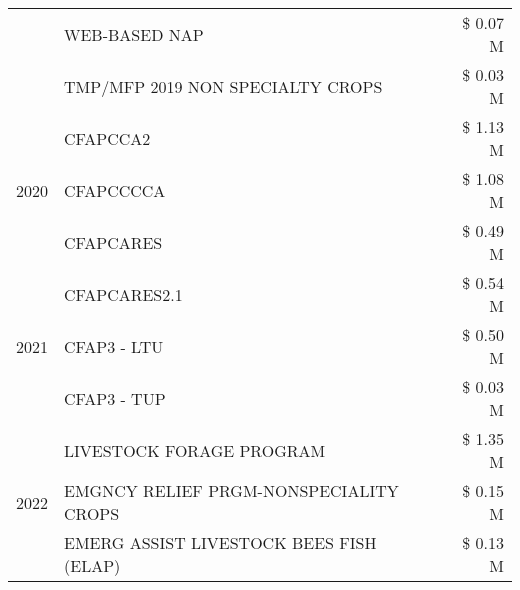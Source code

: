 \begin{tabular}{llr}
 & WEB-BASED NAP & \$ 0.07 M \\
 & TMP/MFP 2019 NON SPECIALTY CROPS & \$ 0.03 M \\
\cline{1-3}
\multirow[t]{3}{*}{2020} & CFAPCCA2 & \$ 1.13 M \\
 & CFAPCCCCA & \$ 1.08 M \\
 & CFAPCARES & \$ 0.49 M \\
\cline{1-3}
\multirow[t]{3}{*}{2021} & CFAPCARES2.1 & \$ 0.54 M \\
 & CFAP3 - LTU & \$ 0.50 M \\
 & CFAP3 - TUP & \$ 0.03 M \\
\cline{1-3}
\multirow[t]{3}{*}{2022} & LIVESTOCK FORAGE PROGRAM & \$ 1.35 M \\
 & EMGNCY RELIEF PRGM-NONSPECIALITY CROPS & \$ 0.15 M \\
 & EMERG ASSIST LIVESTOCK BEES FISH (ELAP) & \$ 0.13 M \\
\cline{1-3}
\bottomrule
\end{tabular}
